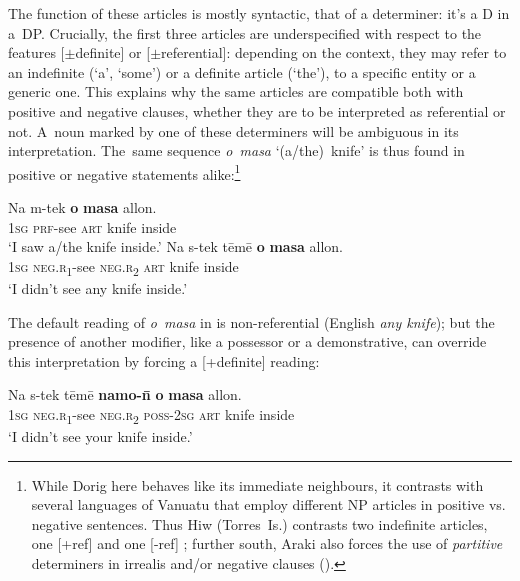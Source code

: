 \documentclass[output=paper,colorlinks,citecolor=brown,draft]{langscibook}
\begin{document}
The function of these articles is mostly syntactic, that of a determiner: it’s a D in a~DP. Crucially, the first three articles are underspecified with respect to the features [\textrm{${\pm}$}definite] or [\textrm{${\pm}$}referential]: depending on the context, they may refer to an indefinite (‘a’, ‘some’) or a definite article (‘the’), to a specific entity or a generic one. This explains why the same articles are compatible both with positive and negative clauses, whether they are to be interpreted as referential or not. A~noun marked by one of these determiners will be ambiguous in its interpretation. The~same sequence \textit{o~masa} ‘(a/the)~knife’ is thus found in positive  or negative  statements alike:\footnote{While Dorig here behaves like its immediate neighbours, it contrasts with several languages of Vanuatu that employ different NP articles in positive vs. negative sentences. Thus Hiw (\mbox{Torres~Is.}) contrasts two indefinite articles, one [+ref] and one [-ref] \citep{François2016b}; further south, Araki also forces the use of \textit{partitive} determiners in irrealis and/or negative clauses (\citealt[54--67]{François2002}).}

\ea\label{ex:dor:masa}
    \ea\label{ex:dor:masa1}
        \gll  Na m-tek \textbf{o} \textbf{masa} allon.\\ 
              \textsc{1sg} \textsc{prf-}see \textsc{art} knife inside\\
         \quad ‘I saw a/the knife inside.’ 
    \ex\label{ex:dor:masa2}
        \gll  Na s-tek tēmē \textbf{o} \textbf{masa} allon.\\
              \textsc{1sg} \textsc{neg.r\textsubscript{1}}-see \textsc{neg.r\textsubscript{2}} \textsc{art} knife inside\\
        \glt [-def] [-ref] \quad ‘I didn’t see any knife inside.’ 
    \z
\z 

The default reading of \textit{o~masa} in  is non-referential (English \textit{any knife}); but the presence of another modifier, like a possessor  or a demonstrative, can override this interpretation by forcing a [+definite] reading:

\ea\label{ex:dor:knife} 
    \gll  Na s-tek tēmē \textbf{namo-\={n}} \textbf{o} \textbf{masa} allon.\\ 
          \textsc{1sg} \textsc{neg.r\textsubscript{1}}-see \textsc{neg.r\textsubscript{2}} \textsc{poss-}\textsc{2sg} \textsc{art} knife inside\\
    \glt [+def] [+ref] \quad ‘I didn’t see your knife inside.’
\z 
\end{document}
